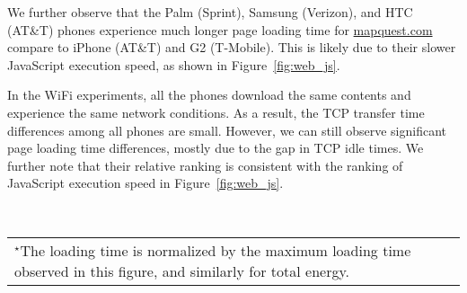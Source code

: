 We further observe that the Palm (Sprint), Samsung (Verizon), and 
HTC (AT\&T) phones experience much longer page loading time for
\url{mapquest.com} compare to iPhone (AT\&T) and G2 (T-Mobile). 
This is likely due to their slower JavaScript execution speed,
as shown in Figure~\ref{fig:web_js}. 


In the WiFi experiments, all the phones download the same contents and 
experience the same network conditions. As a result, the TCP transfer
time differences among all phones are small. However, we can still 
observe significant page loading time differences, mostly due to the
gap in TCP idle times. We further note that their relative ranking is 
consistent with the ranking of JavaScript execution speed in 
Figure~\ref{fig:web_js}.


\begin{figure*}[t]
\centering
{} \\
\begin{tabular}{l}
\\{\scriptsize $^\star$The loading time is normalized by the maximum loading time observed in this figure, and similarly for total energy.}
\end{tabular}
\label{fig:app.compare}
\end{figure*}


